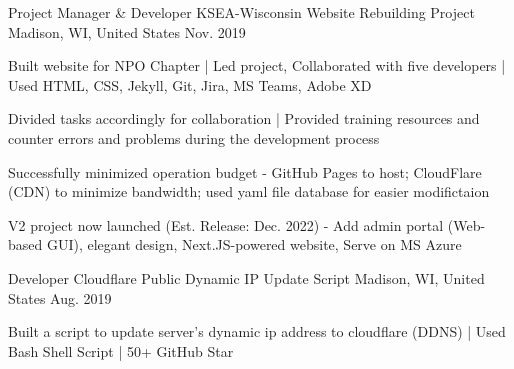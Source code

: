 \begin{cventries}
  \cventry
  {Project Manager \& Developer} %
  {KSEA-Wisconsin Website Rebuilding Project} %
  {Madison, WI, United States} %
  {Nov. 2019} %
  {
    \begin{cvitems} %
      \item {Built website for NPO Chapter | Led project, Collaborated with five developers | Used HTML, CSS, Jekyll, Git, Jira, MS Teams, Adobe XD}
      \item {Divided tasks accordingly for collaboration | Provided training resources and counter errors and problems during the development process}
      \item {Successfully minimized operation budget - GitHub Pages to host; CloudFlare (CDN) to minimize bandwidth; used yaml file database for easier modifictaion}
      \item {V2 project now launched (Est. Release: Dec. 2022) - Add admin portal (Web-based GUI), elegant design, Next.JS-powered website, Serve on MS Azure}
    \end{cvitems}
  }

  \cventry
  {Developer} %
  {Cloudflare Public Dynamic IP Update Script} %
  {Madison, WI, United States} %
  {Aug. 2019} %
  {
    \begin{cvitems} %
      \item {Built a script to update server's dynamic ip address to cloudflare (DDNS) | Used Bash Shell Script | 50+ GitHub Star}
    \end{cvitems}
  }

\end{cventries}
